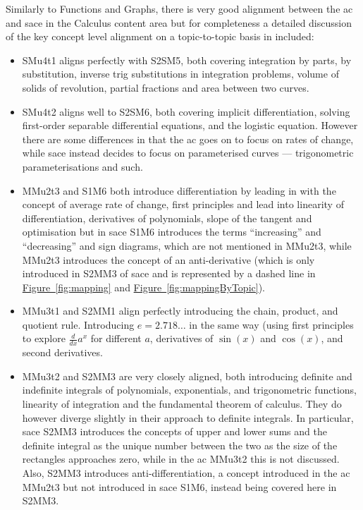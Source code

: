 \documentclass[twoside,12pt,a4paper]{report}
\newcommand{\reffig}[1]{\hyperref[fig:#1]{Figure~\ref{fig:#1}}}
\begin{document}
Similarly to Functions and Graphs, there is very good alignment between the \gls{ac} and \gls{sace} in the Calculus content area but for completeness a detailed discussion of the key concept level alignment on a topic-to-topic basis in included:

\begin{itemize}
	\item SMu4t1 aligns perfectly with S2SM5, both covering integration by parts, by substitution, inverse trig substitutions in integration problems, volume of solids of revolution, partial fractions and area between two curves. 
	\item SMu4t2 aligns well to S2SM6, both covering implicit differentiation, solving first-order separable differential equations, and the logistic equation. However there are some differences in that the \gls{ac} goes on to focus on rates of change, while \gls{sace} instead decides to focus on parameterised curves --- trigonometric parameterisations and such.
	\item MMu2t3 and S1M6 both introduce differentiation by leading in with the concept of average rate of change, first principles and lead into linearity of differentiation, derivatives of polynomials, slope of the tangent and optimisation but in \gls{sace} S1M6 introduces the terms ``increasing'' and ``decreasing'' and sign diagrams, which are not mentioned in MMu2t3, while MMu2t3 introduces the concept of an anti-derivative (which is only introduced in S2MM3 of \gls{sace} and is represented by a dashed line in \reffig{mapping} and \reffig{mappingByTopic}).  
	\item MMu3t1 and S2MM1 align perfectly introducing the chain, product, and quotient rule. Introducing $e = 2.718\hdots$ in the same way (using first principles to explore $\frac{d}{dx}{a^x}$ for different $a$, derivatives of $\sin(x)$ and $\cos(x)$, and second derivatives.  
	\item MMu3t2 and S2MM3 are very closely aligned, both introducing definite and indefinite integrals of polynomials, exponentials, and trigonometric functions, linearity of integration and the fundamental theorem of calculus. They do however diverge slightly in their approach to definite integrals. In particular, \gls{sace} S2MM3 introduces the concepts of upper and lower sums and the definite integral as the unique number between the two as the size of the rectangles approaches zero, while in the \gls{ac} MMu3t2 this is not discussed. Also, S2MM3 introduces anti-differentiation, a concept introduced in the \gls{ac} MMu2t3 but not introduced in \gls{sace} S1M6, instead being covered here in S2MM3.
\end{itemize}
	
\end{document}

